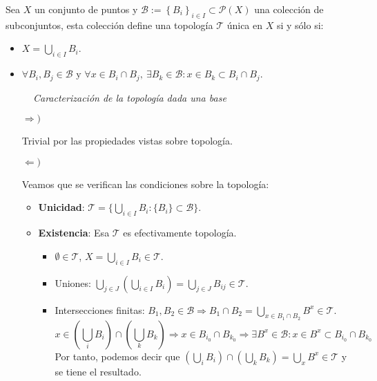 \begin{prop}
Sea $X$ un conjunto de puntos y $\mathcal{B} := \left\{ B_i \right\}_{i \in I} \subset \mathcal{P}\left( X \right)$ una colección de subconjuntos, esta colección define una topología $\mathcal{T}$ única en $X$ si y sólo si: 
\begin{itemize}
    \item $X = \bigcup_{i\in I} B_i$.
    \item $\forall B_i,B_j\in \mathcal{B} \mbox{ y } \forall x \in B_i \cap B_j, \ \exists B_k \in \mathcal{B} : x\in B_k\subset B_i \cap B_j$.
\end{itemize}
\begin{figure}[H]
    \centering
    \caption{\textit{Caracterización de la topología dada una base}}
    \label{fig:caracterización-de-la-topología-dada-una-base}
\end{figure}

\end{prop}
\begin{demo}
\begin{itemize}
\item[$\Rightarrow)$]

Trivial por las propiedades vistas sobre topología.

\item[$\Leftarrow)$]

Veamos que se verifican las condiciones sobre la topología:
\begin{itemize}
    \item \textbf{Unicidad}: $\mathcal{T} = \{\bigcup_{i \in  I} B_i: \{B_i\} \subset \mathcal{B}\}$.
    \item \textbf{Existencia}: Esa $\mathcal{T}$ es efectivamente topología. 
        \begin{itemize}
            \item $\emptyset \in \mathcal{T}$, $X = \bigcup_{i\in I} B_i \in \mathcal{T}$.
            \item Uniones: $\bigcup_{j\in J} \left(\bigcup_{i\in I} B_{i}\right) = \bigcup_{j\in J} B_{ij} \in \mathcal{T}$. 
            \item Intersecciones finitas: $B_1, B_2 \in \mathcal{B} \Rightarrow B_1 \cap B_2 = \bigcup_{x \in B_1 \cap B_2} B^x \in \mathcal{T}$.
            $$
            x \in \left( \bigcup_{i} B_i \right) \cap \left( \bigcup_{k} B_k \right) \Rightarrow x \in B_{i_0} \cap B_{k_0} \Rightarrow \exists B^x \in \mathcal{B} : x\in B^x \subset B_{i_0} \cap B_{k_0}
            $$
            Por tanto, podemos decir que $\left( \bigcup_{i} B_i \right) \cap \left( \bigcup_{k} B_k \right) = \bigcup_{x} B^x \in \mathcal{T}
            $ y se tiene el resultado.
        \end{itemize}
\end{itemize}
\end{itemize}
\end{demo}

